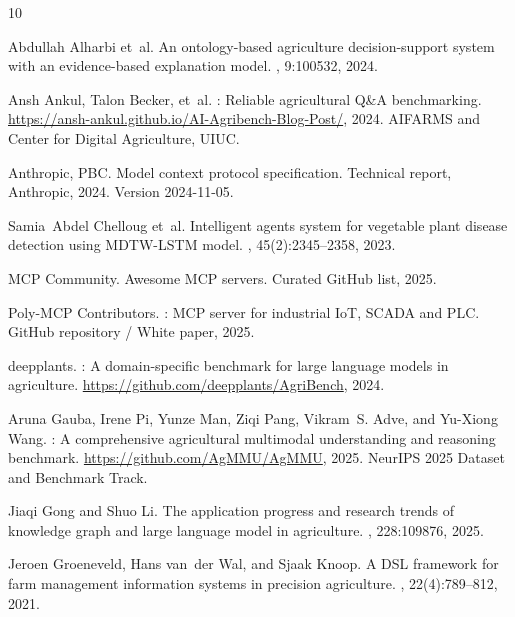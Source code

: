 \documentclass[11pt,a4paper]{article}
\begin{document}
\begin{thebibliography}{10}

Abdullah Alharbi et~al.
\newblock An ontology-based agriculture decision-support system with an
  evidence-based explanation model.
, 9:100532, 2024.

Ansh Ankul, Talon Becker, et~al.
: Reliable agricultural {Q\&A} benchmarking.
\newblock \url{https://ansh-ankul.github.io/AI-Agribench-Blog-Post/}, 2024.
\newblock AIFARMS and Center for Digital Agriculture, UIUC.

{Anthropic, PBC}.
\newblock Model context protocol specification.
\newblock Technical report, Anthropic, 2024.
\newblock Version 2024-11-05.

Samia~Abdel Chelloug et~al.
\newblock Intelligent agents system for vegetable plant disease detection using
  {MDTW-LSTM} model.
, 45(2):2345--2358,
  2023.

MCP Community.
\newblock Awesome {MCP} servers.
\newblock Curated GitHub list, 2025.

Poly-MCP Contributors.
: {MCP} server for industrial {IoT}, {SCADA} and
  {PLC}.
\newblock GitHub repository / White paper, 2025.

{deepplants}.
: A domain-specific benchmark for large language models in
  agriculture.
\newblock \url{https://github.com/deepplants/AgriBench}, 2024.

Aruna Gauba, Irene Pi, Yunze Man, Ziqi Pang, Vikram~S. Adve, and Yu-Xiong Wang.
: A comprehensive agricultural multimodal understanding and
  reasoning benchmark.
\newblock \url{https://github.com/AgMMU/AgMMU}, 2025.
\newblock NeurIPS 2025 Dataset and Benchmark Track.

Jiaqi Gong and Shuo Li.
\newblock The application progress and research trends of knowledge graph and
  large language model in agriculture.
, 228:109876, 2025.

Jeroen Groeneveld, Hans van~der Wal, and Sjaak Knoop.
\newblock A {DSL} framework for farm management information systems in
  precision agriculture.
, 22(4):789--812, 2021.


\end{thebibliography}
\end{document}
